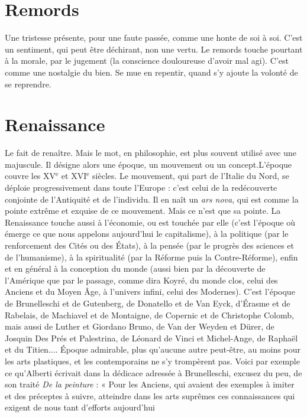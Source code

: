 \section{Remords}
Une tristesse présente, pour une faute passée, comme une honte
de soi à soi. C’est un sentiment, qui peut être déchirant, non
une vertu. Le remords touche pourtant à la morale, par le jugement (la conscience
douloureuse d’avoir mal agi). C’est comme une nostalgie du bien. Se
mue en repentir, quand s’y ajoute la volonté de se reprendre.

\section{Renaissance}
Le fait de renaître. Mais le mot, en philosophie, est plus
souvent utilisé avec une majuscule. Il désigne alors une
époque, un mouvement ou un concept.L'époque couvre les
{\footnotesize XV$^\text{e}$} et {\footnotesize XVI$^\text{e}$} siècles.
Le mouvement, qui part de l'Italie du Nord, se déploie progressivement dans
toute l’Europe : c’est celui de la redécouverte conjointe de l'Antiquité et de
l'individu. Il en naît un {\it ars nova}, qui est comme la pointe extrême et exquise
de ce mouvement. Mais ce n’est que sa pointe. La Renaissance touche aussi à
l’économie, ou est touchée par elle (c’est l’époque où émerge ce que nous appelons
aujourd’hui le capitalisme), à la politique (par le renforcement des Cités
ou des États), à la pensée (par le progrès des sciences et de l’humanisme), à la
spiritualité (par la Réforme puis la Contre-Réforme), enfin et en général à la
conception du monde (aussi bien par la découverte de l'Amérique que par le
passage, comme dira Koyré, du monde clos, celui des Anciens et du Moyen
Âge, à l'univers infini, celui des Modernes). C’est l’époque de Brunelleschi et
de Gutenberg, de Donatello et de Van Eyck, d’Érasme et de Rabelais, de
Machiavel et de Montaigne, de Copernic et de Christophe Colomb, mais
aussi de Luther et Giordano Bruno, de Van der Weyden et Dürer, de Josquin
Des Prés et Palestrina, de Léonard de Vinci et Michel-Ange, de Raphaël et du
Titien.... Époque admirable, plus qu'aucune autre peut-être, au moins pour
les arts plastiques, et les contemporains ne s’y trompèrent pas. Voici par
exemple ce qu'Alberti écrivait dans la dédicace adressée à Brunelleschi,
excusez du peu, de son traité {\it De la peinture} : « Pour les Anciens, qui avaient
des exemples à imiter et des préceptes à suivre, atteindre dans les arts
suprêmes ces connaissances qui exigent de nous tant d’efforts aujourd’hui
